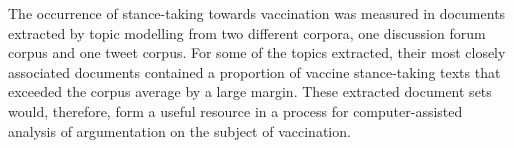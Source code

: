 The occurrence of stance-taking towards vaccination was measured in documents extracted by topic modelling from two different corpora, one discussion forum corpus and one tweet corpus. For some of the topics extracted, their most closely associated documents  contained a proportion of vaccine stance-taking texts that exceeded the corpus average by a large margin. These extracted document sets would, therefore, form a useful resource in a process for computer-assisted analysis of argumentation on the subject of vaccination.
